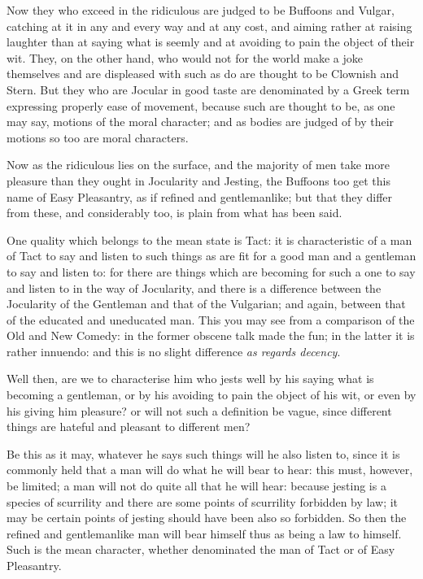 Now they who exceed in the ridiculous are judged to be Buffoons and Vulgar,
catching at it in any and every way and at any cost, and aiming rather at
raising laughter than at saying what is seemly and at avoiding to pain the
object of their wit. They, on the other hand, who would not for the world make
a joke themselves and are displeased with such as do are thought to be Clownish
and Stern. But they who are Jocular in good taste are denominated by a Greek
term expressing properly ease of movement, because such are thought to be, as
one may say, motions of the moral character; and as bodies are judged of by
their motions so too are moral characters.

Now as the ridiculous lies on the surface, and the majority of men take more
pleasure than they ought in Jocularity and Jesting, the Buffoons too get this
name of Easy Pleasantry, as if refined and gentlemanlike; but that they differ
from these, and considerably too, is plain from what has been said.

One quality which belongs to the mean state is Tact: it is characteristic of a
man of Tact to say and listen to such things as are fit for a good man and a
gentleman to say and listen to: for there are things which are becoming for
such a one to say and listen to in the way of Jocularity, and there is a
difference between the Jocularity of the Gentleman and that of the Vulgarian;
and again, between that of the educated and uneducated man. This you may see
from a comparison of the Old and New Comedy: in the former obscene talk made
the fun; in the latter it is rather innuendo: and this is no slight difference
\emph{as regards decency}.

Well then, are we to characterise him who jests well by his saying what is
becoming a gentleman, or by his avoiding to pain the object of his wit, or even
by his giving him pleasure? or will not such a definition be vague, since
different things are hateful and pleasant to different men?

Be this as it may, whatever he says such things will he also listen to, since
it is commonly held that a man will do what he will bear to hear: this must,
however, be limited; a man will not do quite all that he will hear: because
jesting is a species of scurrility and there are some points of scurrility
forbidden by law; it may be certain points of jesting should have been also so
forbidden. So then the refined and gentlemanlike man will bear himself thus as
being a law to himself. Such is the mean character, whether denominated the man
of Tact or of Easy Pleasantry.

